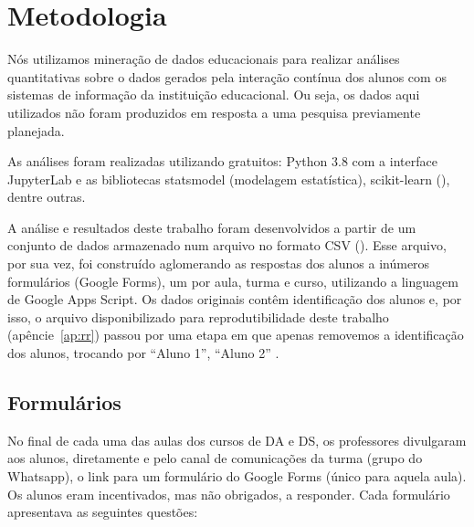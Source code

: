 \section{Metodologia}
\label{sec:metodologia}

Nós utilizamos mineração de dados educacionais \cite{Baker2011} para realizar análises quantitativas sobre o dados gerados pela interação contínua dos alunos com os sistemas de informação da instituição educacional.
Ou seja, os dados aqui utilizados não foram produzidos em resposta a uma pesquisa previamente planejada.

As análises foram realizadas utilizando  gratuitos: Python 3.8 com a interface JupyterLab e as bibliotecas statsmodel (modelagem estatística), scikit-learn (), dentre outras.

A análise e resultados deste trabalho foram desenvolvidos a partir de um conjunto de dados armazenado num arquivo no formato CSV ().
Esse arquivo, por sua vez, foi construído aglomerando as respostas dos alunos a inúmeros formulários (Google Forms), um por aula, turma e curso, utilizando a linguagem de  Google Apps Script.
Os dados originais contêm identificação dos alunos e, por isso, o arquivo disponibilizado para reprodutibilidade deste trabalho (apêncie~\ref{ap:rr}) passou por uma etapa em que apenas removemos a identificação dos alunos, trocando por ``Aluno 1'', ``Aluno 2'' \etc.

\subsection{Formulários}

No final de cada uma das aulas dos cursos de DA e DS, os professores divulgaram aos alunos, diretamente e pelo canal de comunicações da turma (grupo do Whatsapp), o link para um formulário do Google Forms (único para aquela aula).
Os alunos eram incentivados, mas não obrigados, a responder.
Cada formulário apresentava as seguintes questões:

